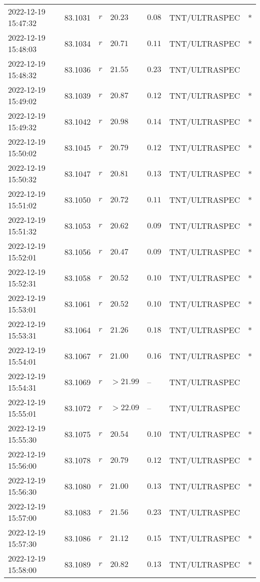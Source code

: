 \documentclass{nature_plusfigure}
\begin{document}
\begin{supplement}
\begin{center}
\begin{longtable}{lllllll}
2022-12-19 15:47:32 & 83.1031 & $r$ & $20.23$ & $0.08$ & TNT/ULTRASPEC & * \\ 
2022-12-19 15:48:03 & 83.1034 & $r$ & $20.71$ & $0.11$ & TNT/ULTRASPEC & * \\ 
2022-12-19 15:48:32 & 83.1036 & $r$ & $21.55$ & $0.23$ & TNT/ULTRASPEC &  \\ 
2022-12-19 15:49:02 & 83.1039 & $r$ & $20.87$ & $0.12$ & TNT/ULTRASPEC & * \\ 
2022-12-19 15:49:32 & 83.1042 & $r$ & $20.98$ & $0.14$ & TNT/ULTRASPEC & * \\ 
2022-12-19 15:50:02 & 83.1045 & $r$ & $20.79$ & $0.12$ & TNT/ULTRASPEC & * \\ 
2022-12-19 15:50:32 & 83.1047 & $r$ & $20.81$ & $0.13$ & TNT/ULTRASPEC & * \\ 
2022-12-19 15:51:02 & 83.1050 & $r$ & $20.72$ & $0.11$ & TNT/ULTRASPEC & * \\ 
2022-12-19 15:51:32 & 83.1053 & $r$ & $20.62$ & $0.09$ & TNT/ULTRASPEC & * \\ 
2022-12-19 15:52:01 & 83.1056 & $r$ & $20.47$ & $0.09$ & TNT/ULTRASPEC & * \\ 
2022-12-19 15:52:31 & 83.1058 & $r$ & $20.52$ & $0.10$ & TNT/ULTRASPEC & * \\ 
2022-12-19 15:53:01 & 83.1061 & $r$ & $20.52$ & $0.10$ & TNT/ULTRASPEC & * \\ 
2022-12-19 15:53:31 & 83.1064 & $r$ & $21.26$ & $0.18$ & TNT/ULTRASPEC & * \\ 
2022-12-19 15:54:01 & 83.1067 & $r$ & $21.00$ & $0.16$ & TNT/ULTRASPEC & * \\ 
2022-12-19 15:54:31 & 83.1069 & $r$ & $>21.99$ & -- & TNT/ULTRASPEC &  \\ 
2022-12-19 15:55:01 & 83.1072 & $r$ & $>22.09$ & -- & TNT/ULTRASPEC &  \\ 
2022-12-19 15:55:30 & 83.1075 & $r$ & $20.54$ & $0.10$ & TNT/ULTRASPEC & * \\ 
2022-12-19 15:56:00 & 83.1078 & $r$ & $20.79$ & $0.12$ & TNT/ULTRASPEC & * \\ 
2022-12-19 15:56:30 & 83.1080 & $r$ & $21.00$ & $0.13$ & TNT/ULTRASPEC & * \\ 
2022-12-19 15:57:00 & 83.1083 & $r$ & $21.56$ & $0.23$ & TNT/ULTRASPEC &  \\ 
2022-12-19 15:57:30 & 83.1086 & $r$ & $21.12$ & $0.15$ & TNT/ULTRASPEC & * \\ 
2022-12-19 15:58:00 & 83.1089 & $r$ & $20.82$ & $0.13$ & TNT/ULTRASPEC & * \\ 

\end{longtable}
\end{center}
\end{supplement}
\end{document}
